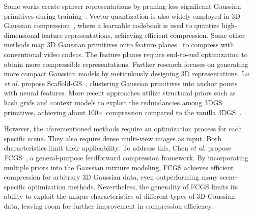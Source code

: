 \documentclass[lettersize,journal]{IEEEtran}
\begin{document}
Some works create sparser representations by pruning less significant Gaussian primitives during training~\cite{papantonakis2024reducing, lee2024compactrad, shi2024lapisgs, wang2024end2end, fan2024lightgaussian}. 
Vector quantization is also widely employed in 3D Gaussian compression~\cite{papantonakis2024reducing, lee2024compactrad, wang2024end2end, fan2024lightgaussian, navaneet2024compgs}, where a learnable codebook is used to quantize high-dimensional feature representations, achieving efficient compression. 
Some other methods map 3D Gaussian primitives onto feature planes~\cite{morgenstern2024compact_selforg,lee2025compression} to compress with conventional video codecs. The feature planes require end-to-end optimization to obtain more compressible representations.
Further research focuses on generating more compact Gaussian models by meticulously designing 3D representations. Lu \textit{et al.} propose Scaffold-GS~\cite{lu2024scaffold}, clustering Gaussian primitives into anchor points with neural features.
More recent approaches utilize structural priors such as hash grids and context models to exploit the redundancies among 3DGS primitives, achieving about 100$\times$ compression compared to the vanilla 3DGS~\cite{chen2024hac,wang2024contextgs,chen2025hac++}.

However, the aforementioned methods require an optimization process for each specific scene. They also require dense multi-view images as input. Both characteristics limit their applicability. To address this, Chen \textit{et al.} propose FCGS~\cite{chen2024fcgc}, a general-purpose feedforward compression framework. By incorporating multiple priors into the Gaussian mixture modeling, FCGS achieves efficient compression for arbitrary 3D Gaussian data, even outperforming many scene-specific optimization methods. Nevertheless, the generality of FCGS limits its ability to exploit the unique characteristics of different types of 3D Gaussian data, leaving room for further improvement in compression efficiency.
\end{document}
